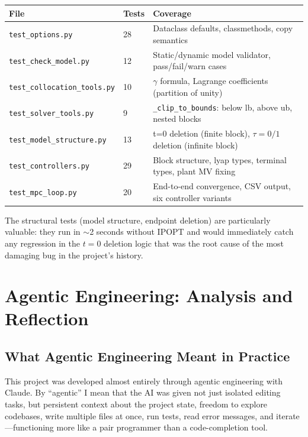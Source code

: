 \documentclass[11pt,letterpaper]{article}
\begin{document}
\begin{center}
\begin{tabular}{lll}
\toprule
\textbf{File} & \textbf{Tests} & \textbf{Coverage} \\
\midrule
\texttt{test\_options.py} & 28 & Dataclass defaults, classmethods, copy semantics \\
\texttt{test\_check\_model.py} & 12 & Static/dynamic model validator, pass/fail/warn cases \\
\texttt{test\_collocation\_tools.py} & 10 & $\gamma$ formula, Lagrange coefficients (partition of unity) \\
\texttt{test\_solver\_tools.py} & 9 & \texttt{\_clip\_to\_bounds}: below lb, above ub, nested blocks \\
\texttt{test\_model\_structure.py} & 13 & t=0 deletion (finite block), $\tau=0/1$ deletion (infinite block) \\
\texttt{test\_controllers.py} & 29 & Block structure, lyap types, terminal types, plant MV fixing \\
\texttt{test\_mpc\_loop.py} & 20 & End-to-end convergence, CSV output, six controller variants \\
\bottomrule
\end{tabular}
\end{center}

The structural tests (model structure, endpoint deletion) are particularly valuable: they run in $\sim$2 seconds without IPOPT and would immediately catch any regression in the $t=0$ deletion logic that was the root cause of the most damaging bug in the project's history.

\section{Agentic Engineering: Analysis and Reflection}

\subsection{What Agentic Engineering Meant in Practice}

This project was developed almost entirely through agentic engineering with Claude. By ``agentic'' I mean that the AI was given not just isolated editing tasks, but persistent context about the project state, freedom to explore codebases, write multiple files at once, run tests, read error messages, and iterate---functioning more like a pair programmer than a code-completion tool.
\end{document}
